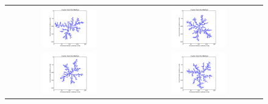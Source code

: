 \documentclass[a4paper,12pt]{article}
\begin{document}
\begin{figure}[H]
\begin{tabular}{@{}cc@{}}
                \includegraphics[width = 0.45\textwidth]{pics/DLA_crystal_final_5.pdf} &
                \includegraphics[width = 0.45\textwidth]{pics/DLA_crystal_final_6.pdf} \\
                \includegraphics[width = 0.45\textwidth]{pics/DLA_crystal_final_7.pdf} &
                \includegraphics[width = 0.45\textwidth]{pics/DLA_crystal_final_8.pdf} \\
	\end{tabular}
\end{figure}
\end{document}
